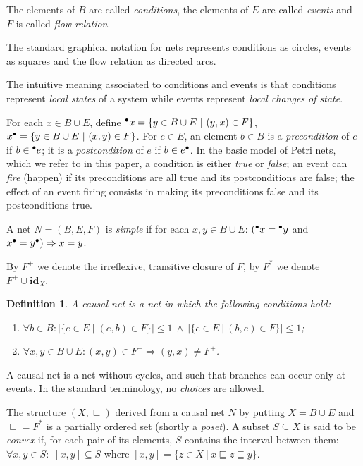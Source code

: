 \documentclass{eptcs}
\newcommand{\id}{\mathrel{\mathbf{id}}}
\newtheorem{definition}{Definition}
\begin{document}
The elements of $B$ are called \emph{conditions}, the elements of $E$
are called \emph{events} and $F$ is called \emph{flow relation}.  

The standard graphical notation for nets represents conditions as
circles, events as squares and the flow relation as directed arcs.

The intuitive meaning associated to conditions and events is that
conditions represent \emph{local states} of a system while events
represent \emph{local changes of state}.

For each $x \in B \cup E$, define
  $ \preco{x} = \{ y \in B \cup E \ | \ (y, x) \in F \} $,
  $ \mbox{${x}^\bullet$} = \{ y \in B \cup E \ | \ (x, y) \in F \} $.
For $e \in E$, an element $b \in B$ is a \emph{precondition} of 
$e$ if $b \in \mbox{${}^\bullet{e}$}$; it is a \emph{postcondition} of $e$
if $b \in \mbox{${e}^\bullet$}$.
In the basic model of Petri nets, which we refer to in this
paper, a condition is either \emph{true} or \emph{false};
an event can \emph{fire} (happen) if its preconditions are
all true and its postconditions are false; the effect of
an event firing consists in making its preconditions false
and its postconditions true.

A net $N = (B, E, F)$ is \emph{simple} if for each $x, y \in B \cup E$:
$(\mbox{${}^\bullet{x}$} = \mbox{${}^\bullet{y}$}$ and $\mbox{${x}^\bullet$} = \mbox{${y}^\bullet$}) \Rightarrow x=y$. 

By $F^+$ we denote the irreflexive, transitive closure of $F$,
by $F^*$ we denote $F^+ \cup \id_X$.

\begin{definition}\label{d:causal_net}
A \emph{causal net} is a net in which the following conditions hold:
    \begin{enumerate}
      \item $\forall b \in B: | \{ e \in E \mid
            (e, b) \in F \}| \le 1 \ \land \ | \{ e \in E \ | \ (b,
            e) \in F \}  | \le 1$;
      \item $\forall x,y \in B \cup E:(x,y) \in F^+
        \Rightarrow (y,x) \not= F^+$.
    \end{enumerate}
\end{definition}

A causal net is a net without cycles, and such that branches can occur
only at events. In the standard terminology, no \emph{choices} are
allowed.

The structure $(X,\sqsubseteq)$ derived from a causal net $N$ 
by putting $X=B \cup E$ and $\sqsubseteq=F^*$ is a partially ordered
set (shortly a \emph{poset}). A subset $S \subseteq X$ is
said to be \emph{convex} if, for each pair of its elements, $S$
contains the interval between them:
$\forall x, y \in S:$ $[x,y] \subseteq S$ where $[x,y]=\{z \in X \ |
\ x \sqsubseteq z \sqsubseteq y\}$.
\end{document}
